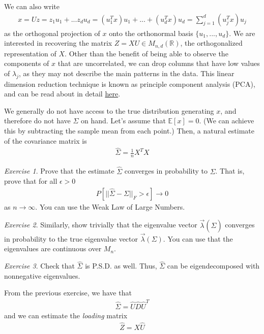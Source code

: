 \documentclass[11pt]{article}
\newcommand{\R}{\ensuremath{\mathbb R}}
\newcommand{\EV}{\ensuremath{\mathbb E}}
\theoremstyle{plain}
\theoremstyle{definition}
\theoremstyle{remark}
\newtheorem{exc}{Exercise}[section]
\begin{document}
We can also write
\begin{align*}
    x = Uz = z_1 u_1 + ... z_d u_d = (u_1^T x)u_1 + ... + (u_d^T x)u_d = \sum_{j=1}^d (u_j^T x)u_j
\end{align*}
as the orthogonal projection of $x$ onto the orthonormal basis $\{u_1, ..., u_d\}$. We are interested in recovering the matrix $Z = XU \in M_{n,d}(\R)$, the orthogonalized representation of $X$. Other than the benefit of being able to observe the components of $x$ that are uncorrelated, we can drop columns that have low values of $\lambda_j$, as they may not describe the main patterns in the data. This linear dimension reduction technique is known as principle component analysis (PCA), and can be read about in detail \href{https://www.stat.cmu.edu/~cshalizi/uADA/12/lectures/ch18.pdf}{here}.

We generally do not have access to the true distribution generating $x$, and therefore do not have $\Sigma$ on hand. Let's assume that $\EV[x] = 0$. (We can achieve this by subtracting the sample mean from each point.) Then, a natural estimate of the covariance matrix is
\begin{align*}
    \hat{\Sigma} = \frac{1}{n} X^T X
\end{align*}
\begin{exc}
    Prove that the estimate $\hat{\Sigma}$ converges in probability to $\Sigma$. That is, prove that for all $\epsilon > 0$
    \begin{align*}
        P[||\hat{\Sigma} - \Sigma||_F > \epsilon] \rightarrow 0
    \end{align*}
    as $n \rightarrow \infty$. You can use the Weak Law of Large Numbers.
\end{exc}
\begin{exc}
    Similarly, show trivially that the eigenvalue vector $\vec{\lambda}(\hat{\Sigma})$ converges in probability to the true eigenvalue vector $\vec{\lambda}(\Sigma)$. You can use that the eigenvalues are continuous over $M_n$.
\end{exc}
\begin{exc}
    Check that $\hat{\Sigma}$ is P.S.D. as well. Thus, $\hat{\Sigma}$ can be eigendecomposed with nonnegative eigenvalues.
\end{exc}
From the previous exercise, we have that
\begin{align*}
    \hat{\Sigma} = \hat{U} \hat{D} \hat{U}^T
\end{align*}
and we can estimate the {\it loading} matrix
\begin{align*}
    \hat{Z} = X \hat{U}
\end{align*}
\end{document}
